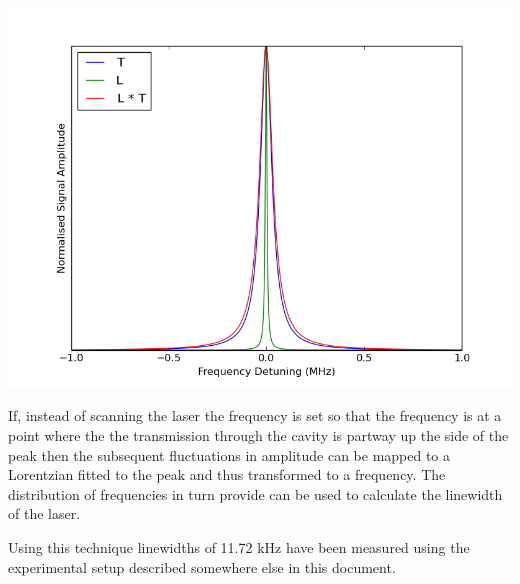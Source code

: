 \documentclass{article}
\newenvironment{Figure}
  {\par\medskip\noindent\minipage{\linewidth}}
  {\endminipage\par\medskip}
\begin{document}
\begin{multicols}{2}
\begin{Figure}
    \centering
    \captionsetup{type=figure}
    \includegraphics[width=\linewidth]{Figs/convolution.png}
    \label{convolution}
\end{Figure}

If, instead of scanning the laser the frequency is set so that the frequency is at a point where the the transmission through the cavity is partway up the side of the peak then the subsequent fluctuations in amplitude can be mapped to a Lorentzian fitted to the peak and thus transformed to a frequency. The distribution of frequencies in turn provide can be used to calculate the linewidth of the laser.

Using this technique linewidths of 11.72 kHz have been measured {\color{red}using the experimental setup described somewhere else in this document}.



\end{multicols}
\end{document}
